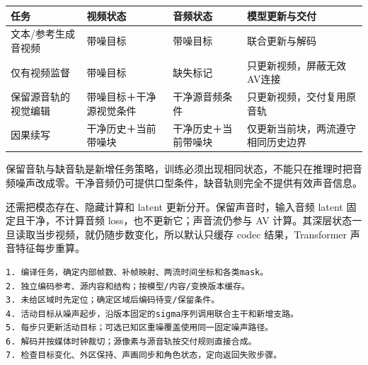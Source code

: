 {\def\LTcaptype{table} %
\small\setlength{\tabcolsep}{3pt}\renewcommand{\arraystretch}{1.18}
\begin{longtable}[]{@{}
  >{\raggedright\arraybackslash}p{}
  >{\raggedright\arraybackslash}p{}
  >{\raggedright\arraybackslash}p{}
  >{\raggedright\arraybackslash}p{}@{}}
\toprule\noalign{}
\begin{minipage}[b]{\linewidth}\raggedright
任务
\end{minipage} & \begin{minipage}[b]{\linewidth}\raggedright
视频状态
\end{minipage} & \begin{minipage}[b]{\linewidth}\raggedright
音频状态
\end{minipage} & \begin{minipage}[b]{\linewidth}\raggedright
模型更新与交付
\end{minipage} \\
\midrule\noalign{}
\endhead
\bottomrule\noalign{}
\endlastfoot
文本/参考生成音视频 & 带噪目标 & 带噪目标 & 联合更新与解码 \\
仅有视频监督 & 带噪目标 & 缺失标记 & 只更新视频，屏蔽无效AV连接 \\
保留源音轨的视觉编辑 & 带噪目标＋干净源视觉条件 & 干净源音频条件 & 只更新视频，交付复用原音轨 \\
因果续写 & 干净历史＋当前带噪块 & 干净历史＋当前带噪块 & 仅更新当前块，两流遵守相同历史边界 \\
\end{longtable}
}

保留音轨与缺音轨是新增任务策略，训练必须出现相同状态，不能只在推理时把音频噪声改成零。干净音频仍可提供口型条件，缺音轨则完全不提供有效声音信息。

还需把模态存在、隐藏计算和 latent 更新分开。保留声音时，输入音频 latent 固定且干净，不计算音频 loss，也不更新它；声音流仍参与 AV 计算。其深层状态一旦读取当步视频，就仍随步数变化，所以默认只缓存 codec 结果，Transformer 声音特征每步重算。

\begin{verbatim}
1. 编译任务，确定内部帧数、补帧映射、两流时间坐标和各类mask。
2. 独立编码参考、源内容和结构；按模型/内容/变换版本缓存。
3. 未给区域时先定位；确定区域后编码待变/保留条件。
4. 活动目标从噪声起步，沿版本固定的sigma序列调用联合主干和新增支路。
5. 每步只更新活动目标；可选已知区重噪覆盖使用同一固定噪声路径。
6. 解码并按媒体时钟裁切；源像素与源音轨按交付规则直接合成。
7. 检查目标变化、外区保持、声画同步和角色状态，定向返回失败步骤。
\end{verbatim}

